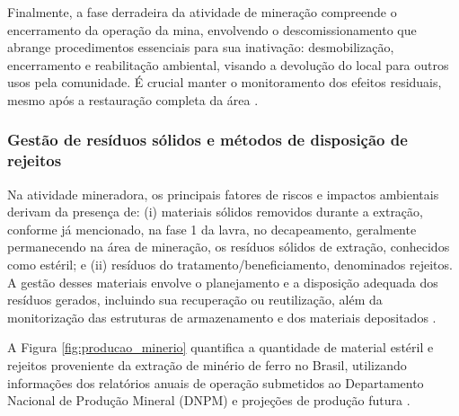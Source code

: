 Finalmente, a fase derradeira da atividade de mineração compreende o
encerramento da operação da mina, envolvendo o descomissionamento que
abrange procedimentos essenciais para sua inativação: desmobilização,
encerramento e reabilitação ambiental, visando a devolução do local para
outros usos pela comunidade. É crucial manter o monitoramento dos
efeitos residuais, mesmo após a restauração completa da área \cite{carvalho2018sustentabilidade}.

\subsubsection{Gestão de resíduos sólidos e métodos de disposição de rejeitos}
\label{subsubsec:gestao_residuos}

Na atividade mineradora, os principais fatores de riscos e impactos
ambientais derivam da presença de: (i) materiais sólidos removidos
durante a extração, conforme já mencionado, na fase 1 da lavra, no
decapeamento, geralmente permanecendo na área de mineração, os resíduos
sólidos de extração, conhecidos como estéril; e (ii) resíduos do
tratamento/beneficiamento, denominados rejeitos. A gestão desses
materiais envolve o planejamento e a disposição adequada dos resíduos
gerados, incluindo sua recuperação ou reutilização, além da
monitorização das estruturas de armazenamento e dos materiais
depositados \cite[p.357]{carvalho2018sustentabilidade}.

A Figura \ref{fig:producao_minerio} quantifica a quantidade de material estéril e rejeitos
proveniente da extração de minério de ferro no Brasil, utilizando
informações dos relatórios anuais de operação submetidos ao Departamento
Nacional de Produção Mineral (DNPM) e projeções de produção futura
\cite[p.358]{carvalho2018sustentabilidade}.


